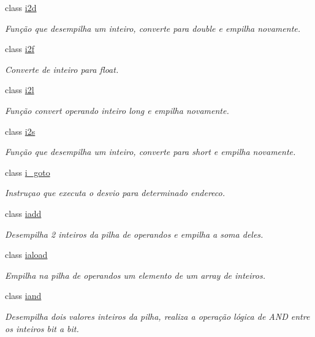 \begin{DoxyCompactItemize}
class \hyperlink{class_instruction_impl_1_1i2d}{i2d}
\begin{DoxyCompactList}\small\item\em Função que desempilha um inteiro, converte para double e empilha novamente. \end{DoxyCompactList}\item 
class \hyperlink{class_instruction_impl_1_1i2f}{i2f}
\begin{DoxyCompactList}\small\item\em Converte de inteiro para float. \end{DoxyCompactList}\item 
class \hyperlink{class_instruction_impl_1_1i2l}{i2l}
\begin{DoxyCompactList}\small\item\em Função convert operando inteiro long e empilha novamente. \end{DoxyCompactList}\item 
class \hyperlink{class_instruction_impl_1_1i2s}{i2s}
\begin{DoxyCompactList}\small\item\em Função que desempilha um inteiro, converte para short e empilha novamente. \end{DoxyCompactList}\item 
class \hyperlink{class_instruction_impl_1_1i__goto}{i\+\_\+goto}
\begin{DoxyCompactList}\small\item\em Instruçao que executa o desvio para determinado endereco. \end{DoxyCompactList}\item 
class \hyperlink{class_instruction_impl_1_1iadd}{iadd}
\begin{DoxyCompactList}\small\item\em Desempilha 2 inteiros da pilha de operandos e empilha a soma deles. \end{DoxyCompactList}\item 
class \hyperlink{class_instruction_impl_1_1iaload}{iaload}
\begin{DoxyCompactList}\small\item\em Empilha na pilha de operandos um elemento de um array de inteiros. \end{DoxyCompactList}\item 
class \hyperlink{class_instruction_impl_1_1iand}{iand}
\begin{DoxyCompactList}\small\item\em Desempilha dois valores inteiros da pilha, realiza a operação lógica de A\+ND entre os inteiros bit a bit. \end{DoxyCompactList}\item 

\end{DoxyCompactItemize}
